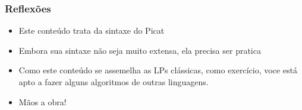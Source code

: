 \begin{frame}[fragile]
\frametitle{Reflexões}

\begin{itemize}


  \item Este  conteúdo trata da sintaxe do Picat
  
    \pause
  \item Embora sua sintaxe não seja muito extensa, ela precisa 
  ser pratica
  
    \pause
  \item Como este conteúdo se assemelha as LPs clássicas, como exercício,
  voce está apto a fazer alguns algoritmos de outras linguagens.
  
      \pause
  \item Mãos a obra!
 
\end{itemize}

\end{frame}
